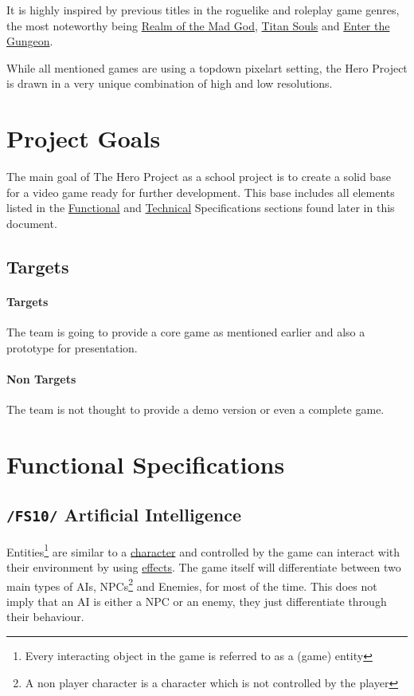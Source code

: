 \documentclass[11pt]{article}
\begin{document}
It is highly inspired by previous titles in the roguelike and roleplay game genres, the most noteworthy being \href{https://realmofthemadgod.com}{Realm of the Mad God}, \href{http://www.devolverdigital.com/games/view/titan-souls}{Titan Souls} and \href{http://dodgeroll.com/gungeon/}{Enter the Gungeon}.

While all mentioned games are using a topdown pixelart setting, the Hero Project is drawn in a very unique combination of high and low resolutions.

\section{Project Goals}
The main goal of The Hero Project as a school project is to create a solid base for a video game ready for further development.
This base includes all elements listed in the \hyperref[sec:fs]{Functional} and \hyperref[sec:ts]{Technical} Specifications sections found later in this document.

\subsection{Targets}
\paragraph{Targets}
The team is going to provide a core game as mentioned earlier and also a prototype for presentation.
\paragraph{Non Targets}
The team is not thought to provide a demo version or even a complete game.

\newpage

\section{Functional Specifications}\label{sec:fs}
\subsection{\texttt{/FS10/} Artificial Intelligence}\label{subsec:fs10ai}
Entities\footnote{Every interacting object in the game is referred to as a (game) entity} are similar to a \hyperref[subsec:fs20character]{character} and controlled by the game can interact with their environment by using \hyperref[subsec:fs30effects]{effects}.
The game itself will differentiate between two main types of AIs, NPCs\footnote{A non player character is a character which is not controlled by the player} and Enemies, for most of the time. 
This does not imply that an AI is either a NPC or an enemy, they just differentiate through their behaviour.
\end{document}
